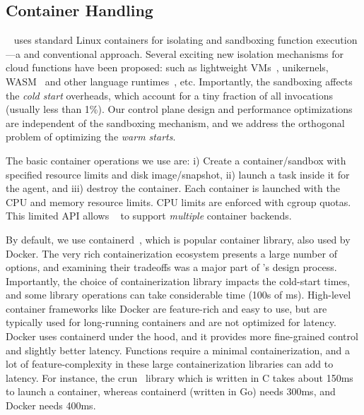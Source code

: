 \subsection{Container Handling}
\label{sec:design:ctr}

\sysname~ uses standard Linux containers for isolating and sandboxing function execution---a  and conventional approach.  
Several exciting new isolation mechanisms for cloud functions
have been proposed: such as lightweight VMs~\cite{firecracker-nsdi20}, unikernels, WASM~\cite{shillaker2020faasm} and other language runtimes~\cite{graalvm}, etc. 
Importantly, the sandboxing affects the \emph{cold start} overheads, which account for a tiny fraction of all invocations (usually less than 1\%).
Our control plane design and performance optimizations are independent of the sandboxing mechanism, and we address the orthogonal problem of optimizing the \emph{warm starts}. 

The basic container operations we use are: i) Create a container/sandbox with specified resource limits and disk image/snapshot, ii) launch a task inside it for the agent, and iii) destroy the container.
Each container is launched with the CPU and memory resource limits. CPU limits are enforced with cgroup quotas. 
This limited API allows \sysname~ to support \emph{multiple} container backends.


By default, we use containerd~\cite{containerd}, which is popular container library, also used by Docker. 
The very rich containerization ecosystem presents a large number of options, and examining their tradeoffs was a major part of \sysname's design process.
Importantly, the choice of containerization library impacts the cold-start times, and some library operations can take considerable time (100s of ms). 
High-level container frameworks like Docker are feature-rich and easy to use, but are typically used for long-running containers and are not optimized for latency.
Docker uses containerd under the hood, and it provides  more fine-grained control and slightly better latency.
Functions require a minimal containerization, and a lot of feature-complexity in these large containerization libraries can add to latency.
For instance, the crun~\cite{crun} library which is written in C takes about 150ms to launch a container, whereas containerd (written in Go) needs 300ms, and Docker needs 400ms. 

